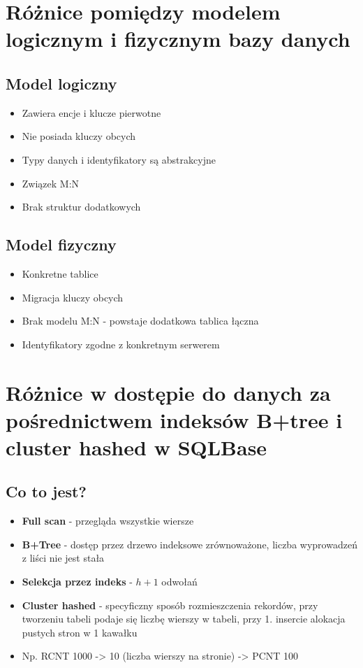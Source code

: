 \documentclass[a4paper,twoside]{article}
\begin{document}
  	\section*{Różnice pomiędzy modelem logicznym i fizycznym bazy danych}
  	\subsection*{Model logiczny}	%
  	\begin{itemize}
  		\item Zawiera encje i klucze pierwotne
  		\item Nie posiada kluczy obcych
  		\item Typy danych i identyfikatory są abstrakcyjne
  		\item Związek M:N
  		\item Brak struktur dodatkowych
  	\end{itemize}
  	\subsection*{Model fizyczny}	%
  	\begin{itemize}
  		\item Konkretne tablice
  		\item Migracja kluczy obcych
  		\item Brak modelu M:N - powstaje dodatkowa tablica łączna
  		\item Identyfikatory zgodne z konkretnym serwerem
  	\end{itemize}
  	
  	\section*{Różnice w dostępie do danych za pośrednictwem indeksów B+tree i cluster hashed w SQLBase}
  	\subsection*{Co to jest?}
  	\begin{itemize}
  		\item \textbf{Full scan} - przegląda wszystkie wiersze
  		\item \textbf{B+Tree} - dostęp przez drzewo indeksowe zrównoważone, liczba wyprowadzeń z liści nie jest stała
  		\item \textbf{Selekcja przez indeks} - ${h+1}$ odwołań
  		\item \textbf{Cluster hashed} - specyficzny sposób rozmieszczenia rekordów, przy tworzeniu tabeli podaje się liczbę wierszy w tabeli, przy 1.  insercie alokacja pustych stron w 1 kawałku
  		\item Np. RCNT 1000 -> 10 (liczba wierszy na stronie) -> PCNT 100
  	\end{itemize}
\end{document}
